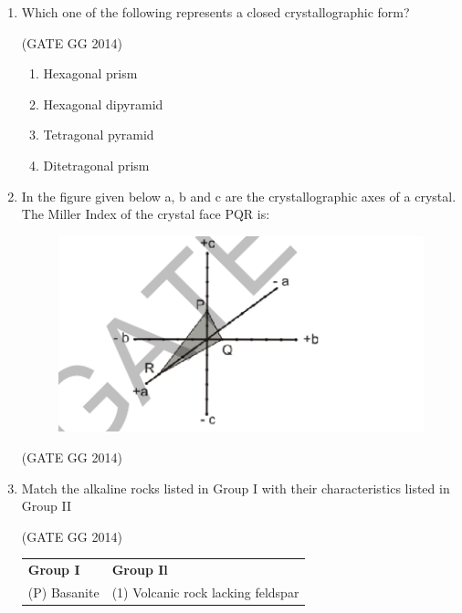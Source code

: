 \documentclass[journal]{IEEEtran}
\begin{document}
\begin{enumerate}[start=1]
\item Which one of the following represents a closed crystallographic form?

\hfill{(GATE GG 2014)}\\
\begin{multicols}{2}
    \begin{enumerate}
    \item  Hexagonal prism
\item Hexagonal dipyramid
\item  Tetragonal pyramid
\item Ditetragonal prism

\end{enumerate}
\end{multicols}


\item In the figure given below a, b and c are the crystallographic axes of a crystal. The Miller Index of the crystal face PQR is:
\begin{figure}[H]
    \centering
    \includegraphics[width=0.5\columnwidth]{figs/02.png} 
    \caption{}
    \label{fig:48}
\end{figure}

\hfill{(GATE GG 2014)}\\
\begin{enumerate}
\end{enumerate}

\item Match the alkaline rocks listed in Group I with their characteristics listed in Group II

\hfill{(GATE GG 2014)}\\
\begin{tabular}{ l l }
\textbf{Group I} & \textbf{Group Il}\\
(P) Basanite & (1) Volcanic rock lacking feldspar\\


\end{tabular}
\end{enumerate}
\end{document}

